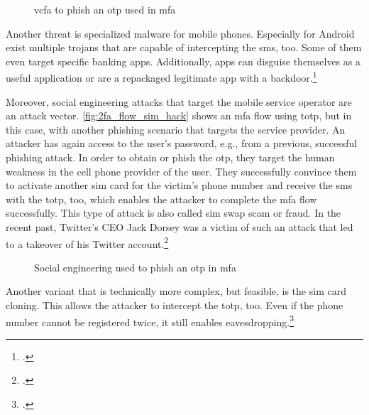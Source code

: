 \begin{figure}[hbt]
	\centering
	
	\caption[\gls{vcfa} to phish an \gls{otp} used in \gls{mfa}]{\gls{vcfa} to phish an \gls{otp} used in \gls{mfa}\footnotemark}
	\label{fig:2fa_flow_forward_phishing}
\end{figure}

Another threat is specialized malware for mobile phones. Especially for Android exist multiple trojans that are capable of intercepting the \gls{sms}, too. Some of them even target specific banking apps. Additionally, apps can disguise themselves as a useful application or are a repackaged legitimate app with a backdoor.\footcites[See][146--149]{dmitrienko2014security}[See][152--154]{10.1007/978-3-642-39235-1_9}[See][114]{HAMED2017109}[See][]{eset-bypass2fa}

\newpage

Moreover, social engineering attacks that target the mobile service operator are an attack vector. \autoref{fig:2fa_flow_sim_hack} shows an \gls{mfa} flow using \gls{totp}, but in this case, with another phishing scenario that targets the service provider. An attacker has again access to the user's password, e.g., from a previous, successful phishing attack. In order to obtain or phish the \gls{otp}, they target the human weakness in the cell phone provider of the user. They successfully convince them to activate another \gls{sim} card for the victim's phone number and receive the \gls{sms} with the \gls{totp}, too, which enables the attacker to complete the \gls{mfa} flow successfully. This type of attack is also called \gls{sim} swap scam or fraud. In the recent past, Twitter's CEO Jack Dorsey was a victim of such an attack that led to a takeover of his Twitter account.\footcites[See][19]{BLAICH201719}[See][]{twitter-hack}[See][74--76]{10.1007/978-3-642-19228-9_7}
\\
\begin{figure}[hbt]
	\centering
	
	\caption[Social engineering used to phish an \gls{otp} in \gls{mfa}]{Social engineering used to phish an \gls{otp} in \gls{mfa}\footnotemark}
	\label{fig:2fa_flow_sim_hack}
\end{figure}

Another variant that is technically more complex, but feasible, is the \gls{sim} card cloning. This allows the attacker to intercept the \gls{totp}, too. Even if the phone number cannot be registered twice, it still enables eavesdropping.\footcites[See][873]{eckert-it-sec-9}[See][11--12]{sim-clone}

